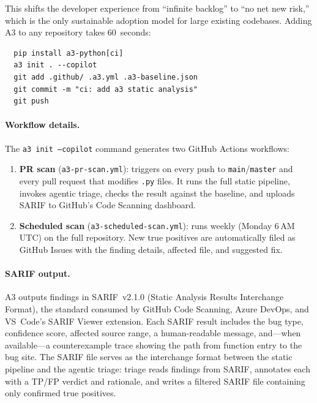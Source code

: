 \documentclass[sigconf,review,anonymous]{acmart}
\begin{document}
This shifts the developer experience from ``infinite backlog'' to ``no net new risk,'' which is the only sustainable adoption model for large existing codebases.
Adding \textsc{A3} to any repository takes 60~seconds:
\begin{verbatim}
  pip install a3-python[ci]
  a3 init . --copilot
  git add .github/ .a3.yml .a3-baseline.json
  git commit -m "ci: add a3 static analysis"
  git push
\end{verbatim}

\paragraph{Workflow details.}
The \texttt{a3 init --copilot} command generates two GitHub Actions workflows:
\begin{enumerate}
  \item \textbf{PR scan} (\texttt{a3-pr-scan.yml}): triggers on every push to \texttt{main}/\texttt{master} and every pull request that modifies \texttt{.py} files.  It runs the full static pipeline, invokes agentic triage, checks the result against the baseline, and uploads SARIF to GitHub's Code Scanning dashboard.
  \item \textbf{Scheduled scan} (\texttt{a3-scheduled-scan.yml}): runs weekly (Monday 6\,AM UTC) on the full repository.  New true positives are automatically filed as GitHub Issues with the finding details, affected file, and suggested fix.
\end{enumerate}

\paragraph{SARIF output.}
\textsc{A3} outputs findings in SARIF~v2.1.0 (Static Analysis Results Interchange Format), the standard consumed by GitHub Code Scanning, Azure DevOps, and VS~Code's SARIF Viewer extension.
Each SARIF result includes the bug type, confidence score, affected source range, a human-readable message, and---when available---a counterexample trace showing the path from function entry to the bug site.
The SARIF file serves as the interchange format between the static pipeline and the agentic triage: triage reads findings from SARIF, annotates each with a TP/FP verdict and rationale, and writes a filtered SARIF file containing only confirmed true positives.
\end{document}
